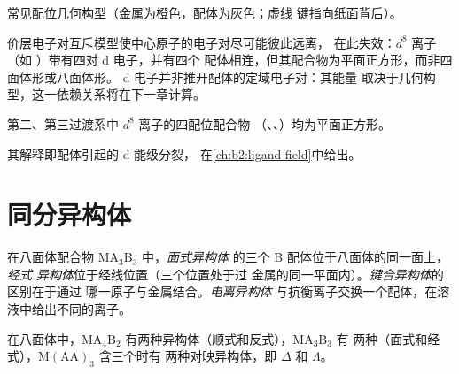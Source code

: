 \begin{omfigure}

{\small 常见配位几何构型（金属为橙色，配体为灰色；虚线
键指向纸面背后）。}
\end{omfigure}

价层电子对互斥模型使中心原子的电子对尽可能彼此远离，
在此失效：$d^8$ 离子（如 ）带有四对 d 电子，并有四个
配体相连，但其配合物为平面正方形，而非四面体形或八面体形。
d 电子并非推开配体的定域电子对：其能量
取决于几何构型，这一依赖关系将在下一章计算。

\begin{proposition}[平面正方形 $d^8$]\label{prop:b2:coordination-complexes:square-planar}
第二、第三过渡系中 $d^8$ 离子的四配位配合物
（、、）均为平面正方形。
\end{proposition}

\admitted

其解释即配体引起的 d 能级分裂，
在\cref{ch:b2:ligand-field}中给出。

\section{同分异构体}

\begin{definition}[配合物的同分异构体]\label{def:b2:coordination-complexes:isomers}
在八面体配合物 $\mathrm{MA_3B_3}$ 中，\emph{面式异构体}
的三个 B 配体位于八面体的同一面上，\emph{经式
异构体}位于经线位置（三个位置处于过
金属的同一平面内）。\emph{键合异构体}的区别在于通过
哪一原子与金属结合。\emph{电离异构体}
与抗衡离子交换一个配体，在溶液中给出不同的离子。
\end{definition}

\begin{proposition}[八面体异构体的计数]\label{prop:b2:coordination-complexes:isomer-count}
在八面体中，$\mathrm{MA_4B_2}$ 有两种异构体（顺式和反式），$\mathrm{MA_3B_3}$ 有
两种（面式和经式），$\mathrm M(\mathrm{AA})_3$ 含三个时有
两种对映异构体，即 $\Delta$ 和 $\Lambda$。
\end{proposition}


